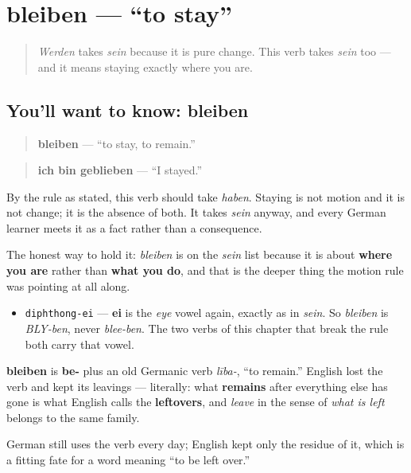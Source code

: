 \section[bleiben]{bleiben — \textquotedblleft{}to stay\textquotedblright{}}

\label{lesson:GE-C16-bleiben}



\begin{quote}
\emph{Werden} takes \emph{sein} because it is pure change. This verb takes \emph{sein} too — and it means staying exactly where you are.
\end{quote}

\subsection*{You'll want to know: bleiben}
\begin{quote}
\textbf{bleiben} — \textquotedblleft{}to stay, to remain.\textquotedblright{}
\end{quote}

\begin{quote}
\textbf{ich bin geblieben} — \textquotedblleft{}I stayed.\textquotedblright{}
\end{quote}

By the rule as stated, this verb should take \emph{haben}. Staying is not motion and it is not change; it is the absence of both. It takes \emph{sein} anyway, and every German learner meets it as a fact rather than a consequence.

The honest way to hold it: \emph{bleiben} is on the \emph{sein} list because it is about \textbf{where you are} rather than \textbf{what you do}, and that is the deeper thing the motion rule was pointing at all along.

\begin{sounds}
\begin{itemize}
\raggedright
  \item \texttt{diphthong-ei} — \textbf{ei} is the \emph{eye} vowel again, exactly as in \emph{sein}. So \emph{bleiben} is \emph{BLY-ben}, never \emph{blee-ben}. The two verbs of this chapter that break the rule both carry that vowel.
\end{itemize}
\end{sounds}

\begin{cousinweb}
\textbf{bleiben} is \textbf{be-} plus an old Germanic verb \emph{lība-}, \textquotedblleft{}to remain.\textquotedblright{} English lost the verb and kept its leavings — literally: what \textbf{remains} after everything else has gone is what English calls the \textbf{leftovers}, and \emph{leave} in the sense of \emph{what is left} belongs to the same family.

German still uses the verb every day; English kept only the residue of it, which is a fitting fate for a word meaning \textquotedblleft{}to be left over.\textquotedblright{}
\end{cousinweb}

